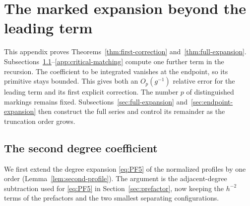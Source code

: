 \section{The marked expansion beyond the leading term}\label{app:marked}

This appendix proves Theorems~\ref{thm:first-correction}
and~\ref{thm:full-expansion}. Subsections~\ref{app:second-degree}--\ref{app:critical-matching}
compute one further term in the recursion. The coefficient to be integrated
vanishes at the endpoint, so its primitive stays bounded. This gives both
an $O_p(g^{-1})$ relative error for the leading term and its first explicit
correction. The number $p$ of distinguished markings remains fixed.
Subsections~\ref{sec:full-expansion} and~\ref{sec:endpoint-expansion}
then construct the full series and control its remainder as the
truncation order grows.

\subsection{The second degree coefficient}\label{app:second-degree}

We first extend the degree expansion \eqref{eq:PF5} of the normalized
profiles by one order (Lemma~\ref{lem:second-profile}). The argument is
the adjacent-degree subtraction used for \eqref{eq:PF5} in
Section~\ref{sec:prefactor}, now
keeping the $h^{-2}$ terms of the prefactors and the two smallest
separating configurations.

